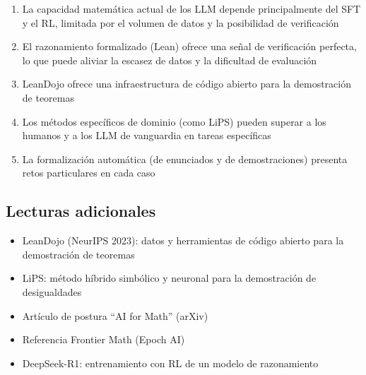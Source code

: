 \documentclass[a4paper]{article}
\begin{document}
\begin{enumerate}
    \item La capacidad matemática actual de los LLM depende principalmente del SFT y el RL, limitada por el volumen de datos y la posibilidad de verificación
    \item El razonamiento formalizado (Lean) ofrece una señal de verificación perfecta, lo que puede aliviar la escasez de datos y la dificultad de evaluación
    \item LeanDojo ofrece una infraestructura de código abierto para la demostración de teoremas
    \item Los métodos específicos de dominio (como LiPS) pueden superar a los humanos y a los LLM de vanguardia en tareas específicas
    \item La formalización automática (de enunciados y de demostraciones) presenta retos particulares en cada caso
\end{enumerate}

\subsection{Lecturas adicionales}
\begin{itemize}
    \item LeanDojo (NeurIPS 2023): datos y herramientas de código abierto para la demostración de teoremas
    \item LiPS: método híbrido simbólico y neuronal para la demostración de desigualdades
    \item Artículo de postura ``AI for Math'' (arXiv)
    \item Referencia Frontier Math (Epoch AI)
    \item DeepSeek-R1: entrenamiento con RL de un modelo de razonamiento
\end{itemize}
\end{document}

